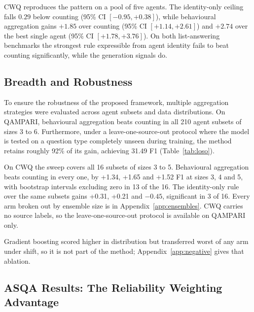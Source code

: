 \documentclass{article}
\begin{document}
CWQ reproduces the pattern on a pool of five agents. The identity-only ceiling falls $0.29$ below counting (95\% CI $[-0.95, +0.38]$), while behavioural aggregation gains $+1.85$ over counting (95\% CI $[+1.14, +2.61]$) and $+2.74$ over the best single agent (95\% CI $[+1.78, +3.76]$). On both list-answering benchmarks the strongest rule expressible from agent identity fails to beat counting significantly, while the generation signals do.


\subsection{Breadth and Robustness}
\label{sec:breadth}
\label{sec:robust}

To ensure the robustness of the proposed framework, multiple aggregation strategies were evaluated across agent subsets and data distributions. On QAMPARI, behavioural aggregation beats counting in all 210 agent subsets of sizes 3 to 6. Furthermore, under a leave-one-source-out protocol where the model is tested on a question type completely unseen during training, the method retains roughly 92\% of its gain, achieving 31.49 F1 (Table~\ref{tab:loso}).

On CWQ the sweep covers all 16 subsets of sizes 3 to 5. Behavioural aggregation beats counting in every one, by +1.34, +1.65 and +1.52 F1 at sizes 3, 4 and 5, with bootstrap intervals excluding zero in 13 of the 16. The identity-only rule over the same subsets gains +0.31, +0.21 and $-0.45$, significant in 3 of 16. Every arm broken out by ensemble size is in Appendix~\ref{app:ensembles}. CWQ carries no source labels, so the leave-one-source-out protocol is available on QAMPARI only.

Gradient boosting scored higher in distribution but transferred worst of any arm under shift, so it is not part of the method; Appendix~\ref{app:negative} gives that ablation.

\subsection{ASQA Results: The Reliability Weighting Advantage}
\label{sec:rq3}

\end{document}
